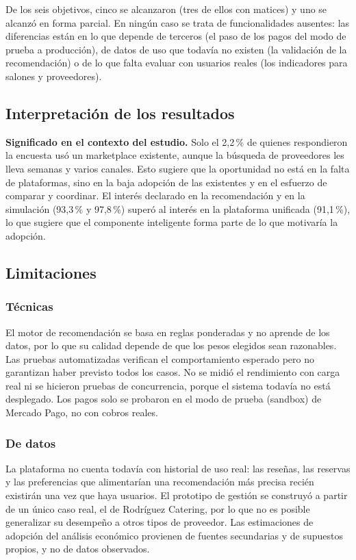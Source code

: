 De los seis objetivos, cinco se alcanzaron (tres de ellos con matices) y
uno se alcanzó en forma parcial. En ningún caso se trata de
funcionalidades ausentes: las diferencias están en lo que depende de
terceros (el paso de los pagos del modo de prueba a producción), de
datos de uso que todavía no existen (la validación de la recomendación)
o de lo que falta evaluar con usuarios reales (los indicadores para
salones y proveedores).

\subsection{Interpretación de los resultados}

\textbf{Significado en el contexto del estudio.} Solo el 2,2\,\% de
quienes respondieron la encuesta usó un marketplace existente, aunque la
búsqueda de proveedores les lleva semanas y varios canales. Esto sugiere
que la oportunidad no está en la falta de plataformas, sino en la baja
adopción de las existentes y en el esfuerzo de comparar y coordinar. El
interés declarado en la recomendación y en la simulación (93,3\,\% y
97,8\,\%) superó al interés en la plataforma unificada (91,1\,\%), lo que
sugiere que el componente inteligente forma parte de lo que motivaría la
adopción.

\subsection{Limitaciones}

\subsubsection{Técnicas}

El motor de recomendación se basa en reglas ponderadas y no aprende de
los datos, por lo que su calidad depende de que los pesos elegidos sean
razonables. Las pruebas automatizadas verifican el comportamiento
esperado pero no garantizan haber previsto todos los casos. No se midió el
rendimiento con carga real ni se hicieron pruebas de concurrencia,
porque el sistema todavía no está desplegado. Los pagos solo se
probaron en el modo de prueba (sandbox) de Mercado Pago, no con cobros
reales.

\subsubsection{De datos}

La plataforma no cuenta todavía con historial de uso real: las reseñas,
las reservas y las preferencias que alimentarían una recomendación más
precisa recién existirán una vez que haya usuarios. El prototipo de
gestión se construyó a partir de un único caso real, el de Rodríguez
Catering, por lo que no es posible generalizar su desempeño a otros
tipos de proveedor. Las estimaciones de adopción del análisis económico
provienen de fuentes secundarias y de supuestos propios, y no de datos
observados.

